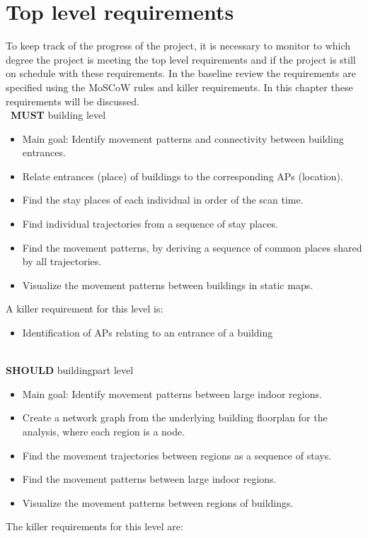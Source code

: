 \section{Top level requirements}
To keep track of the progress of the project, it is necessary to monitor to which degree the project is meeting the top level requirements and if the project is still on schedule with these requirements. In the baseline review the requirements are specified using the MoSCoW rules and killer requirements. In this chapter these requirements will be discussed.\\\
\textbf{MUST} building level
\begin{itemize}
\item Main goal: Identify movement patterns and connectivity between building entrances.
\item {\color{black!50}Relate entrances (place) of buildings to the corresponding APs (location).}
\item Find the stay places of each individual in order of the scan time.
\item Find individual trajectories from a sequence of stay places.
\item Find the movement patterns, by deriving a sequence of common places shared by all trajectories.
\item Visualize the movement patterns between buildings in static maps.
\end{itemize}
A killer requirement for this level is:
\begin{itemize}
\item {\color{black!50}Identification of APs relating to an entrance of a building}\\\\
\end{itemize}
\textbf{SHOULD} buildingpart level 
\begin{itemize}
\item Main goal: Identify movement patterns between large indoor regions. 
\item Create a network graph from the underlying building floorplan for the analysis, where each region is a node.
\item {\color{black!50}Find the movement trajectories between regions as a sequence of stays.}
\item Find the movement patterns between large indoor regions.
\item Visualize the movement patterns between regions of buildings.
\end{itemize}
The killer requirements for this level are:
